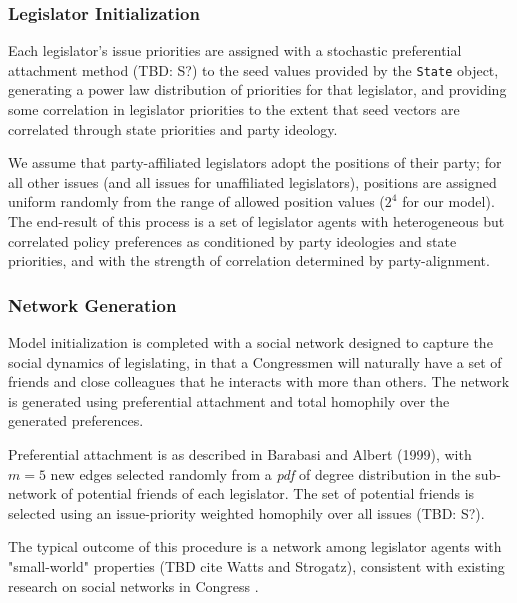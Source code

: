 \documentclass[pdftex,12pt]{llncs}
\begin{document}
\subsubsection{Legislator Initialization}
Each legislator's issue priorities are assigned with a stochastic preferential attachment method (TBD: S?) to the seed values provided by the \texttt{State} object, generating a power law distribution of priorities for that legislator, and providing some correlation in legislator priorities to the extent that seed vectors are correlated through state priorities and party ideology.

We assume that party-affiliated legislators adopt the positions of their party; for all other issues (and all issues for unaffiliated legislators), positions are assigned uniform randomly from the range of allowed position values ($2^4$ for our model).
The end-result of this process is a set of legislator agents with heterogeneous but correlated policy preferences as conditioned by party ideologies and state priorities, and with the strength of correlation determined by party-alignment.
\subsubsection{Network Generation}
Model initialization is completed with a social network designed to capture the social dynamics of legislating, in that a Congressmen will naturally have a set of friends and close colleagues that he interacts with more than others.
The network is generated using preferential attachment and total homophily over the generated preferences.

Preferential attachment is as described in Barabasi and Albert (1999), with $m=5$ new edges selected randomly from a \textit{pdf} of degree distribution in the sub-network of potential friends of each legislator.
The set of potential friends is selected using an issue-priority weighted homophily over all issues (TBD: S?).

The typical outcome of this procedure is a network among legislator agents with "small-world" properties (TBD cite Watts and Strogatz), consistent with existing research on social networks in Congress \parencite{Granovetter1978}.
\end{document}

